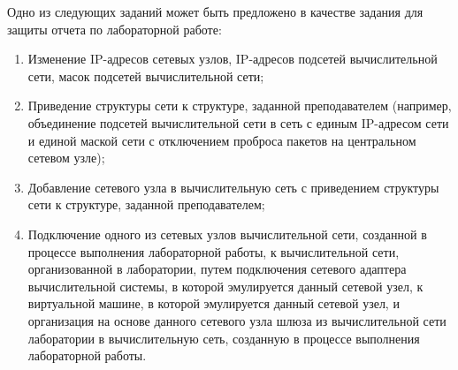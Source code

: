 
Одно из следующих заданий может быть предложено в качестве задания для защиты отчета по лабораторной работе:

\begin{enumerate}

	\item Изменение IP-адресов сетевых узлов, IP-адресов подсетей вычислительной сети, масок подсетей вычислительной
	сети;
	
	\item Приведение структуры сети к структуре, заданной преподавателем (например, объединение подсетей вычислительной
	сети в сеть с единым IP-адресом сети и единой маской сети с отключением проброса пакетов на центральном
	сетевом узле);
	
	\item Добавление сетевого узла в вычислительную сеть с приведением структуры сети к структуре,
	заданной преподавателем;

	\item Подключение одного из сетевых узлов вычислительной сети, созданной в процессе выполнения лабораторной работы,
	к вычислительной сети, организованной в лаборатории, путем подключения сетевого адаптера вычислительной системы,
	в которой эмулируется данный сетевой узел, к виртуальной машине, в которой эмулируется данный сетевой узел,
	и организация на основе данного сетевого узла шлюза из вычислительной сети лаборатории в вычислительную сеть,
	созданную в процессе выполнения лабораторной работы.

\end{enumerate}

